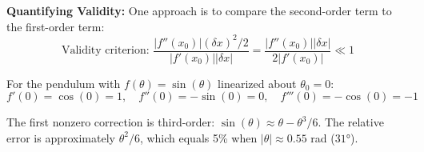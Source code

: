 \textbf{Quantifying Validity:} One approach is to compare the second-order term to the first-order term:
\begin{equation}
\text{Validity criterion: } \frac{|f''(x_0)|(\delta x)^2/2}{|f'(x_0)||\delta x|} = \frac{|f''(x_0)||\delta x|}{2|f'(x_0)|} \ll 1
\end{equation}

For the pendulum with $f(\theta) = \sin(\theta)$ linearized about $\theta_0 = 0$:
\begin{equation}
f'(0) = \cos(0) = 1, \quad f''(0) = -\sin(0) = 0, \quad f'''(0) = -\cos(0) = -1
\end{equation}

The first nonzero correction is third-order: $\sin(\theta) \approx \theta - \theta^3/6$. The relative error is approximately $\theta^2/6$, which equals 5\% when $|\theta| \approx 0.55$ rad ($31°$).

